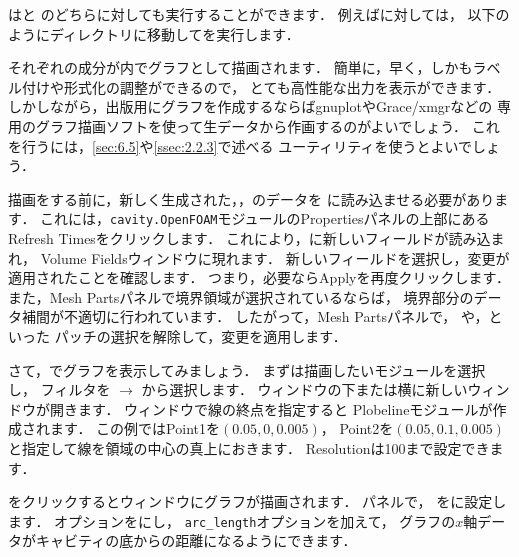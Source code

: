はと
のどちらに対しても実行することができます．
例えばに対しては，
以下のようにディレクトリに移動してを実行します．
それぞれの成分が内でグラフとして描画されます．
簡単に，早く，しかもラベル付けや形式化の調整ができるので，
とても高性能な出力を表示ができます．
しかしながら，出版用にグラフを作成するならばgnuplotやGrace/xmgrなどの
専用のグラフ描画ソフトを使って生データから作画するのがよいでしょう．
これを行うには，\autoref{sec:6.5}や\autoref{ssec:2.2.3}で述べる
ユーティリティを使うとよいでしょう．

描画をする前に，新しく生成された，，のデータを
に読み込ませる必要があります．
これには，\texttt{cavity.OpenFOAM}モジュールのPropertiesパネルの上部にある
Refresh Timesをクリックします．
これにより，に新しいフィールドが読み込まれ，
Volume Fieldsウィンドウに現れます．
新しいフィールドを選択し，変更が適用されたことを確認します．
つまり，必要ならApplyを再度クリックします．
また，Mesh Partsパネルで境界領域が選択されているならば，
境界部分のデータ補間が不適切に行われています．
したがって，Mesh Partsパネルで，
や，といった
パッチの選択を解除して，変更を適用します．

さて，でグラフを表示してみましょう．
まずは描画したいモジュールを選択し，
%
%
フィルタを $\rightarrow$ から選択します．
ウィンドウの下または横に新しいウィンドウが開きます．
ウィンドウで線の終点を指定すると
Plobelineモジュールが作成されます．
この例ではPoint1を$(0.05, 0, 0.005)$，
Point2を$(0.05, 0.1, 0.005)$と指定して線を領域の中心の真上におきます．
Resolutionは100まで設定できます．

をクリックするとウィンドウにグラフが描画されます．
パネルで，
%
%
をに設定します．
オプションをにし，
\verb|arc_length|オプションを加えて，
グラフの$x$軸データがキャビティの底からの距離になるようにできます．


